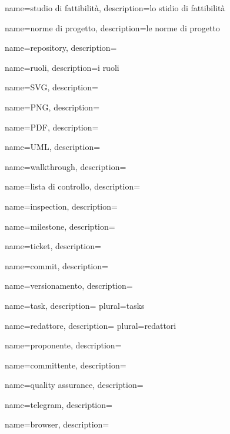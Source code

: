 {
	name=studio di fattibilità,
	description={lo stidio di fattibilità \TODO{}}
}

 {
	name=norme di progetto,
	description={le norme di progetto \TODO{}}
}

 {
	name=repository,
	description={\TODO{}}
}

 {
	name=ruoli,
	description={i ruoli\TODO{}}
}

 {
	name=SVG,
	description={\TODO{}}
}

 {
	name=PNG,
	description={\TODO{}}
}

 {
	name=PDF,
	description={\TODO{}}
}

 {
	name=UML,
	description={\TODO{}}
}

 {
	name=walkthrough,
	description={\TODO{}}
}

 {
	name=lista di controllo,
	description={\TODO{}}
}

 {
	name=inspection,
	description={\TODO{}}
}

 {
	name=milestone,
	description={\TODO{}}
}

 {
	name=ticket,
	description={\TODO{}}
}

 {
	name=commit,
	description={\TODO{}}
}

 {
	name=versionamento,
	description={\TODO{}}
}

 {
	name=task,
	description={\TODO{}}
	plural=tasks
}

 {
	name=redattore,
	description={\TODO{}}
	plural=redattori
}

 {
	name=proponente,
	description={\TODO{}}
}

 {
	name=committente,
	description={\TODO{}}
}

 {
	name=quality assurance,
	description={\TODO{}}
}

 {
	name=telegram,
	description={\TODO{}}
}

 {
	name=browser,
	description={\TODO{}}
}

